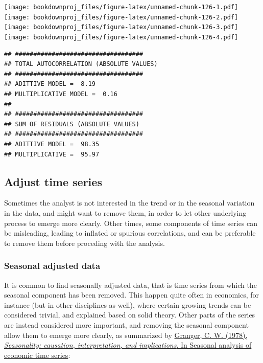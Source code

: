 \documentclass[
]{article}
\begin{document}
\texttt{[image: bookdownproj\_files/figure-latex/unnamed-chunk-126-1.pdf]} \texttt{[image: bookdownproj\_files/figure-latex/unnamed-chunk-126-2.pdf]} \texttt{[image: bookdownproj\_files/figure-latex/unnamed-chunk-126-3.pdf]} \texttt{[image: bookdownproj\_files/figure-latex/unnamed-chunk-126-4.pdf]}

\begin{verbatim}
## ###################################
## TOTAL AUTOCORRELATION (ABSOLUTE VALUES)
## ################################### 
## ADITTIVE MODEL =  8.19 
## MULTIPLICATIVE MODEL =  0.16 
## 
## ###################################
## SUM OF RESIDUALS (ABSOLUTE VALUES)
## ################################### 
## ADITTIVE MODEL =  98.35 
## MULTIPLICATIVE =  95.97
\end{verbatim}

\hypertarget{adjust-time-series}{%
\subsection{Adjust time series}\label{adjust-time-series}}

Sometimes the analyst is not interested in the trend or in the seasonal variation in the data, and might want to remove them, in order to let other underlying process to emerge more clearly. Other times, some components of time series can be misleading, leading to inflated or spurious correlations, and can be preferable to remove them before proceding with the analysis.

\hypertarget{seasonal-adjusted-data}{%
\subsubsection{Seasonal adjusted data}\label{seasonal-adjusted-data}}

It is common to find seasonally adjusted data, that is time series from which the seasonal component has been removed. This happen quite often in economics, for instance (but in other disciplines as well), where certain growing trends can be considered trivial, and explained based on solid theory. Other parts of the series are instead considered more important, and removing the seasonal component allow them to emerge more clearly, as summarized by \href{https://www.nber.org/system/files/chapters/c4321/c4321.pdf}{Granger, C. W. (1978), \emph{Seasonality: causation, interpretation, and implications}. In Seasonal analysis of economic time series}:
\end{document}
